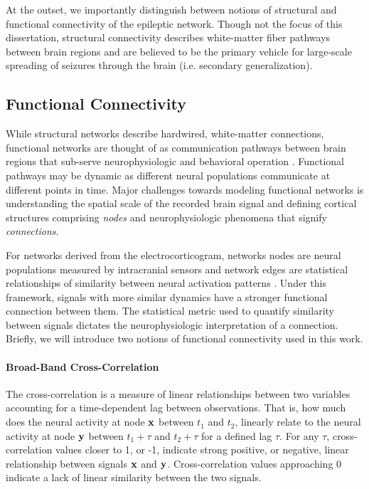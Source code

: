 At the outset, we importantly distinguish between notions of structural and functional connectivity of the epileptic network. Though not the focus of this dissertation, structural connectivity describes white-matter fiber pathways between brain regions and are believed to be the primary vehicle for large-scale spreading of seizures through the brain (i.e. secondary generalization). 

\subsection{Functional Connectivity}
While structural networks describe hardwired, white-matter connections, functional networks are thought of as communication pathways between brain regions that sub-serve neurophysiologic and behavioral operation \cite{bullmore2011brain, friston2011functional, hutchison2013dynamic}. Functional pathways may be dynamic as different neural populations communicate at different points in time. Major challenges towards modeling functional networks is understanding the spatial scale of the recorded brain signal and defining cortical structures comprising \textit{nodes} and neurophysiologic phenomena that signify \textit{connections}.

For networks derived from the electrocorticogram, networks nodes are neural populations measured by intracranial sensors and network edges are statistical relationships of similarity between neural activation patterns \cite{bullmore2011brain, friston2011functional, hutchison2013dynamic}. Under this framework, signals with more similar dynamics have a stronger functional connection between them. The statistical metric used to quantify similarity between signals dictates the neurophysiologic interpretation of a connection. Briefly, we will introduce two notions of functional connectivity used in this work.

\paragraph{Broad-Band Cross-Correlation}
The cross-correlation is a measure of linear relationships between two variables accounting for a time-dependent lag between observations. That is, how much does the neural activity at node $\mathbf{\displaystyle x} $ between $t_1$ and $t_2$, linearly relate to the neural activity at node $\mathbf{\displaystyle y}$ between $t_1+\tau$ and $t_2+\tau$ for a defined lag $\tau$. For any $\tau$, cross-correlation values closer to 1, or -1, indicate strong positive, or negative, linear relationship between signals $\mathbf{\displaystyle x}$ and $\mathbf{\displaystyle y}$. Cross-correlation values approaching 0 indicate a lack of linear similarity between the two signals.  

